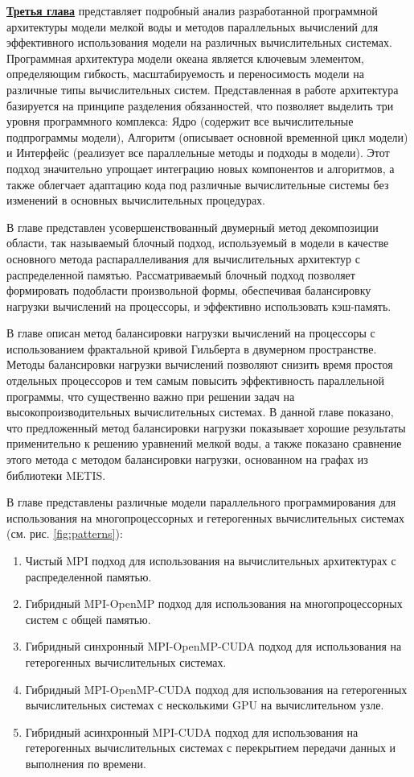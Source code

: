 \underline{\textbf{Третья глава}} представляет подробный анализ разработанной программной архитектуры модели мелкой воды и методов параллельных вычислений для эффективного использования модели на различных вычислительных системах.
Программная архитектура модели океана является ключевым элементом, определяющим гибкость, масштабируемость и переносимость модели на различные типы вычислительных систем. Представленная в работе архитектура базируется на принципе разделения обязанностей, что позволяет выделить три уровня программного комплекса: Ядро (содержит все вычислительные подпрограммы модели), Алгоритм (описывает основной временной цикл модели) и Интерфейс (реализует все параллельные методы и подходы в модели).
Этот подход значительно упрощает интеграцию новых компонентов и алгоритмов, а также облегчает адаптацию кода под различные вычислительные системы без изменений в основных вычислительных процедурах.

В главе представлен усовершенствованный двумерный метод декомпозиции области, так называемый блочный подход, используемый в модели в качестве основного метода распараллеливания для вычислительных архитектур с распределенной памятью.
Рассматриваемый блочный подход позволяет формировать подобласти произвольной формы, обеспечивая балансировку нагрузки вычислений на процессоры, и эффективно использовать кэш-память.

В главе описан метод балансировки нагрузки вычислений на процессоры с использованием фрактальной кривой Гильберта в двумерном пространстве.
Методы балансировки нагрузки вычислений позволяют снизить время простоя отдельных процессоров и тем самым повысить эффективность параллельной программы, что существенно важно при решении задач на высокопроизводительных вычислительных системах.
В данной главе показано, что предложенный метод балансировки нагрузки показывает хорошие результаты применительно к решению уравнений мелкой воды, а также показано сравнение этого метода с методом балансировки нагрузки, основанном на графах из библиотеки METIS.

В главе представлены различные модели параллельного программирования для использования на многопроцессорных и гетерогенных вычислительных системах (см. рис. \ref{fig:patterns}):

\begin{enumerate}

\item Чистый MPI подход для использования на вычислительных архитектурах с распределенной памятью.
\item Гибридный MPI-OpenMP подход для использования на многопроцессорных систем с общей памя­тью.
\item Гибридный синхронный MPI-OpenMP-CUDA подход для использования на гетерогенных вычислительных системах.
\item Гибридный MPI-OpenMP-CUDA подход для использования на гетерогенных вычислительных системах с несколькими GPU на вычислительном узле.
\item Гибридный асинхронный MPI-CUDA подход для использования на гетерогенных вычислительных системах с перекрытием передачи данных и выполнения по времени.

\end{enumerate}

